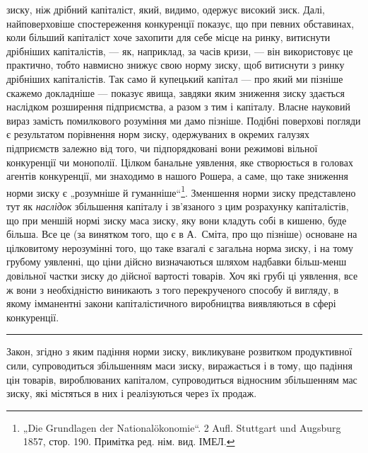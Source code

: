 \parcont{}  %
зиску, ніж дрібний капіталіст, який, видимо, одержує високий зиск. Далі, найповерховіше
спостереження конкуренції показує, що при певних обставинах, коли більший капіталіст хоче захопити
для себе місце на ринку, витиснути дрібніших капіталістів, — як, наприклад, за часів кризи, — він
використовує це практично, тобто навмисно знижує свою норму зиску, щоб витиснути з ринку дрібніших
капіталістів. Так само й купецький капітал — про який ми пізніше скажемо докладніше — показує явища,
завдяки яким зниження зиску здається наслідком розширення підприємства, а разом з тим і капіталу.
Власне науковий вираз замість помилкового розуміння ми дамо пізніше. Подібні поверхові погляди є
результатом порівнення норм зиску, одержуваних в окремих галузях підприємств залежно від того, чи
підпорядковані вони режимові вільної конкуренції чи монополії. Цілком банальне уявлення, яке
створюється в головах агентів конкуренції, ми знаходимо в нашого Рошера, а саме, що таке зниження
норми зиску є „розумніше й гуманніше“\footnote*{
„Die Grundlagen der Nationalökonomie“. 2 Aufl. Stuttgart und Augsburg 1857,
стор. 190. Примітка ред. нім. вид. ІМЕЛ.
}. Зменшення норми зиску представлено тут як \emph{наслідок}
збільшення капіталу і зв’язаного з цим розрахунку капіталістів, що при меншій нормі зиску маса
зиску, яку вони кладуть собі в кишеню, буде більша. Все це (за винятком того, що є в А.~Сміта, про
що пізніше) основане на цілковитому нерозумінні того, що таке взагалі є загальна норма зиску, і на
тому грубому уявленні, що ціни дійсно визначаються шляхом надбавки більш-менш довільної частки зиску
до дійсної вартості товарів. Хоч які грубі ці уявлення, все ж вони з необхідністю виникають з того
перекрученого способу й вигляду, в якому імманентні закони капіталістичного виробництва виявляються
в сфері конкуренції.

\pfbreak{}

Закон, згідно з яким падіння норми зиску, викликуване розвитком продуктивної сили, супроводиться
збільшенням маси зиску, виражається і в тому, що падіння цін товарів, вироблюваних капіталом,
супроводиться відносним збільшенням мас зиску, які містяться в них і реалізуються через їх продаж.

